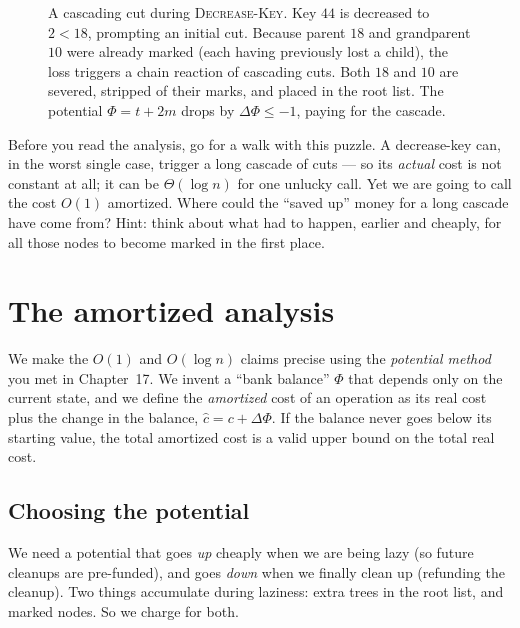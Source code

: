 \begin{figure}[htbp]
\caption{A cascading cut during \textsc{Decrease-Key}. Key $44$ is decreased to $2 < 18$, prompting an initial cut. Because parent $18$ and grandparent $10$ were already marked (each having previously lost a child), the loss triggers a chain reaction of cascading cuts. Both $18$ and $10$ are severed, stripped of their marks, and placed in the root list. The potential $\Phi = t + 2m$ drops by $\Delta \Phi \le -1$, paying for the cascade.}
\label{ch20:fig-cascading-cuts}
\label{ch20:cascade}
\end{figure}

\begin{walkbox}
Before you read the analysis, go for a walk with this puzzle. A decrease-key can,
in the worst single case, trigger a long cascade of cuts --- so its \emph{actual}
cost is not constant at all; it can be $\Theta(\log n)$ for one unlucky call. Yet
we are going to call the cost $O(1)$ amortized. Where could the ``saved up'' money
for a long cascade have come from? Hint: think about what had to happen, earlier
and cheaply, for all those nodes to become marked in the first place.
\end{walkbox}

\section{The amortized analysis}

We make the
$O(1)$ and $O(\log n)$ claims precise using the \emph{potential method} you met in
Chapter~17. We invent a ``bank balance'' $\Phi$ that depends only on the current
state, and we define the \emph{amortized} cost of an operation as its real cost
plus the change in the balance, $\hat{c} = c + \Delta\Phi$. If the balance never
goes below its starting value, the total amortized cost is a valid upper bound on
the total real cost.

\subsection{Choosing the potential}

We need a potential that goes \emph{up} cheaply when we are being lazy (so future
cleanups are pre-funded), and goes \emph{down} when we finally clean up (refunding
the cleanup). Two things accumulate during laziness: extra trees in the root list,
and marked nodes. So we charge for both.

